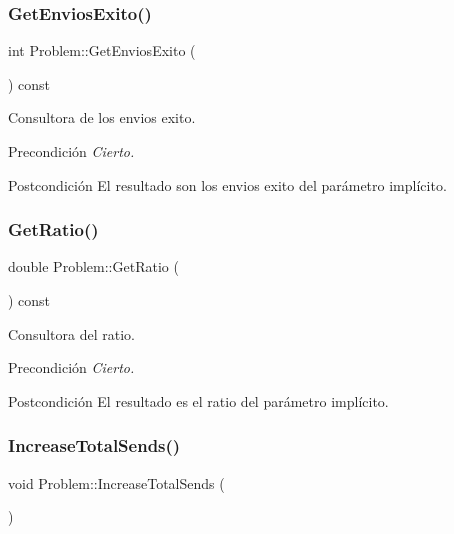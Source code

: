 \subsubsection{\texorpdfstring{Get\+Envios\+Exito()}{GetEnviosExito()}}
{\footnotesize\ttfamily int Problem\+::\+Get\+Envios\+Exito (\begin{DoxyParamCaption}{ }\end{DoxyParamCaption}) const}



Consultora de los envios exito. 

\begin{DoxyPrecond}{Precondición}
{\itshape Cierto.} 
\end{DoxyPrecond}
\begin{DoxyPostcond}{Postcondición}
El resultado son los envios exito del parámetro implícito. 
\end{DoxyPostcond}
\mbox{\label{class_problem_a6aceef9e936ee16ef8368803f22a0268}} 
\subsubsection{\texorpdfstring{Get\+Ratio()}{GetRatio()}}
{\footnotesize\ttfamily double Problem\+::\+Get\+Ratio (\begin{DoxyParamCaption}{ }\end{DoxyParamCaption}) const}



Consultora del ratio. 

\begin{DoxyPrecond}{Precondición}
{\itshape Cierto.} 
\end{DoxyPrecond}
\begin{DoxyPostcond}{Postcondición}
El resultado es el ratio del parámetro implícito. 
\end{DoxyPostcond}
\mbox{\label{class_problem_a8afb8fba991ac36958733992a67c8ed6}} 
\subsubsection{\texorpdfstring{Increase\+Total\+Sends()}{IncreaseTotalSends()}}
{\footnotesize\ttfamily void Problem\+::\+Increase\+Total\+Sends (\begin{DoxyParamCaption}{ }\end{DoxyParamCaption})}



